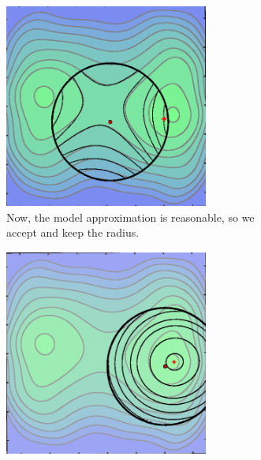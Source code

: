 \begin{figure}[H]
    \vspace{1em}
    
    \begin{subfigure}[b]{0.33\linewidth}
        \centering
        \includegraphics[width=\linewidth]{figures/2background/tr4.png}
        \caption{Now, the model approximation is reasonable, so we accept and keep the radius.}
        \label{fig:tr_example_4}
    \end{subfigure}
    \begin{subfigure}[b]{0.33\linewidth}
        \centering
        \includegraphics[width=\linewidth]{figures/2background/tr5.png}

\end{subfigure}
\end{figure}
